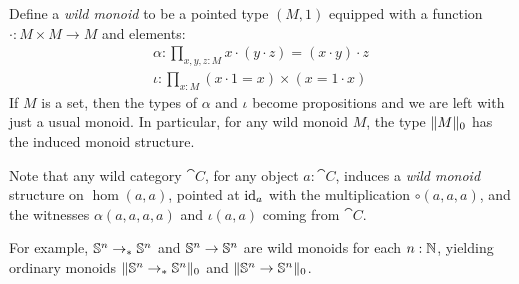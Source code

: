 \documentclass[english,a4paper]{lmcs}
\begin{document}

\begin{rem}
  Define a \emph{wild monoid} to be a pointed type $(M,1)$ equipped with a
  function $\cdot : M \times M \to M$ and elements:
  \begin{gather*}
    \alpha: \prod_{x,y,z:M}x\cdot(y\cdot z) = (x\cdot y) \cdot z \\
    \iota: \prod_{x:M} (x\cdot 1 = x) \times (x = 1 \cdot x)
  \end{gather*}
  If $M$ is a set, then the types of $\alpha$ and $\iota$ become propositions
  and we are left with just a usual monoid. In particular, for any wild monoid
  $M$, the type $\lVert M\rVert_0$ has the induced monoid structure.

  Note that any wild category $\cat C$, for any object $a:\cat C$, induces a
  \emph{wild monoid} structure on $\hom(a,a)$, pointed at $\mathord{\mathrm{id}}_a$ with the
  multiplication $\circ(a,a,a)$, and the witnesses $\alpha(a,a,a,a)$ and $\iota(a,a)$
  coming from $\cat C$.

  For example, ${\mathbb S^{n}} \to_\ast {\mathbb S^{n}}$ and ${\mathbb S^{n}} \to {\mathbb S^{n}}$ are wild monoids for each $n:\mathbb{N}$,
  yielding ordinary  monoids $\lVert{\mathbb S^{n}} \to_\ast {\mathbb S^{n}}\rVert_0$ and $\lVert{\mathbb S^{n}} \to {\mathbb S^{n}}\rVert_0$.
  \label{rem:wild-monoids}
\end{rem}
\end{document}

